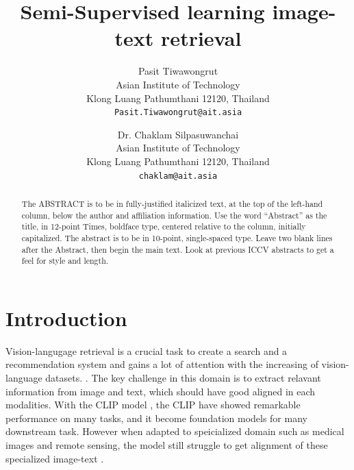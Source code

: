 \documentclass[10pt,twocolumn,letterpaper]{article}
\begin{document}
\title{Semi-Supervised learning image-text retrieval}

\author{Pasit Tiwawongrut\\
Asian Institute of Technology\\
Klong Luang Pathumthani 12120, Thailand\\
{\tt\small Pasit.Tiwawongrut@ait.asia}
\and
Dr. Chaklam Silpasuwanchai\\
Asian Institute of Technology\\
Klong Luang Pathumthani 12120, Thailand\\
{\tt\small chaklam@ait.asia}
}

\maketitle
\ificcvfinal\thispagestyle{empty}\fi

\begin{abstract}
   The ABSTRACT is to be in fully-justified italicized text, at the top
   of the left-hand column, below the author and affiliation
   information. Use the word ``Abstract'' as the title, in 12-point
   Times, boldface type, centered relative to the column, initially
   capitalized. The abstract is to be in 10-point, single-spaced type.
   Leave two blank lines after the Abstract, then begin the main text.
   Look at previous ICCV abstracts to get a feel for style and length.
\end{abstract}

\section{Introduction}

Vision-langugage retrieval is a crucial task to create a search and a recommendation system and gains a lot of attention with the increasing of vision-language datasets. \cite{cross_modal_review, cross_modal_review_2}.
The key challenge in this domain is to extract relavant information from image and text, which should have good aligned in each modalities.
With the CLIP model \cite{clip}, the CLIP have showed remarkable performance on many tasks, and it become foundation models for many downstream task\cite{foundation_model}.
However when adapted to speicialized domain such as medical images and remote sensing, the model still struggle to get alignment of these specialized image-text \cite{s-clip, kim2024discovering}.
\end{document}
